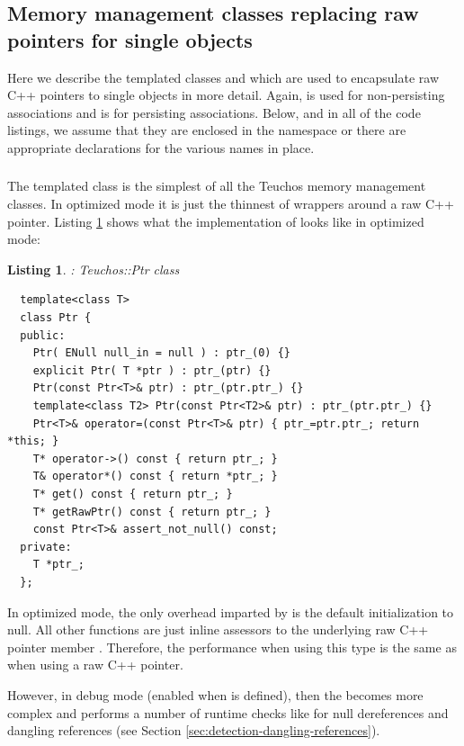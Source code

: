 \documentclass[pdf,ps2pdf,11pt]{SANDreport}
\newtheorem{listing}{Listing}
\begin{document}
%
{}\subsection{Memory management classes replacing raw pointers for
single objects}
%

Here we describe the templated classes {} and
{} which are used to encapsulate raw C++ pointers to
single objects in more detail.  Again, {} is used for
non-persisting associations and {} is for persisting
associations.  Below, and in all of the code listings, we assume that
they are enclosed in the {} namespace or there are
appropriate {} declarations for the various
names in place.

%
{}\subsubsection{}
%

The templated class {} is the simplest of all the Teuchos
memory management classes.  In optimized mode it is just the thinnest
of wrappers around a raw C++ pointer.  Listing {}\ref{listing:Ptr}
shows what the implementation of {} looks like in
optimized mode:

\begin{listing}: Teuchos::Ptr class\\
\label{listing:Ptr}
{\small\begin{verbatim}
  template<class T>
  class Ptr {
  public:
    Ptr( ENull null_in = null ) : ptr_(0) {}
    explicit Ptr( T *ptr ) : ptr_(ptr) {}
    Ptr(const Ptr<T>& ptr) : ptr_(ptr.ptr_) {}
    template<class T2> Ptr(const Ptr<T2>& ptr) : ptr_(ptr.ptr_) {}
    Ptr<T>& operator=(const Ptr<T>& ptr) { ptr_=ptr.ptr_; return *this; }
    T* operator->() const { return ptr_; }
    T& operator*() const { return *ptr_; }
    T* get() const { return ptr_; }
    T* getRawPtr() const { return ptr_; }
    const Ptr<T>& assert_not_null() const;
  private:
    T *ptr_;
  };
\end{verbatim}}
\end{listing}

In optimized mode, the only overhead imparted by {} is the
default initialization to null.  All other functions are just inline
assessors to the underlying raw C++ pointer member {}.
Therefore, the performance when using this type is the same as when
using a raw C++ pointer.

However, in debug mode (enabled when {} is
defined), then the {} becomes more complex and performs a
number of runtime checks like for null dereferences and dangling
references (see Section {}\ref{sec:detection-dangling-references}).
\end{document}
